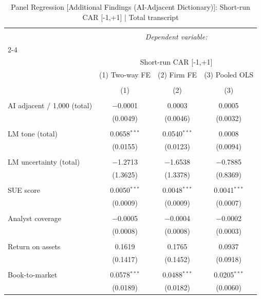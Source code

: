 
\begin{table}[!htbp] \centering 
  \caption{Panel Regression [Additional Findings (AI-Adjacent Dictionary)]: Short-run CAR [-1,+1]  |  Total transcript} 
  \label{} 
\begin{tabular}{@{\extracolsep{5pt}}lccc} 
\\[-1.8ex]\hline 
\hline \\[-1.8ex] 
 & \multicolumn{3}{c}{\textit{Dependent variable:}} \\ 
\cline{2-4} 
\\[-1.8ex] & \multicolumn{3}{c}{Short-run CAR [-1,+1]} \\ 
 & (1) Two-way FE & (2) Firm FE & (3) Pooled OLS \\ 
\\[-1.8ex] & (1) & (2) & (3)\\ 
\hline \\[-1.8ex] 
 AI adjacent / 1,000 (total) & $-$0.0001 & 0.0003 & 0.0005 \\ 
  & (0.0049) & (0.0046) & (0.0032) \\ 
  & & & \\ 
 LM tone (total) & 0.0658$^{***}$ & 0.0540$^{***}$ & 0.0008 \\ 
  & (0.0155) & (0.0123) & (0.0094) \\ 
  & & & \\ 
 LM uncertainty (total) & $-$1.2713 & $-$1.6538 & $-$0.7885 \\ 
  & (1.3625) & (1.3378) & (0.8369) \\ 
  & & & \\ 
 SUE score & 0.0050$^{***}$ & 0.0048$^{***}$ & 0.0041$^{***}$ \\ 
  & (0.0009) & (0.0009) & (0.0007) \\ 
  & & & \\ 
 Analyst coverage & $-$0.0005 & $-$0.0004 & $-$0.0002 \\ 
  & (0.0008) & (0.0008) & (0.0003) \\ 
  & & & \\ 
 Return on assets & 0.1619 & 0.1765 & 0.0937 \\ 
  & (0.1417) & (0.1452) & (0.0918) \\ 
  & & & \\ 
 Book-to-market & 0.0578$^{***}$ & 0.0488$^{***}$ & 0.0205$^{***}$ \\ 
  & (0.0189) & (0.0182) & (0.0060) \\ 

\end{tabular}
\end{table}
